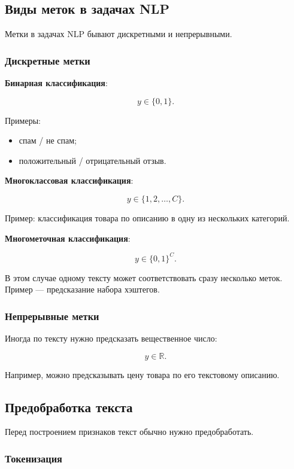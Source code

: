 \documentclass[a4paper,12pt]{article}
\begin{document}
\subsection{Виды меток в задачах NLP}

Метки в задачах NLP бывают дискретными и непрерывными.

\subsubsection{Дискретные метки}

\textbf{Бинарная классификация}:

\[
y \in \{0, 1\}.
\]

Примеры:

\begin{itemize}
    \item спам / не спам;
    \item положительный / отрицательный отзыв.
\end{itemize}

\textbf{Многоклассовая классификация}:

\[
y \in \{1, 2, \dots, C\}.
\]

Пример: классификация товара по описанию в одну из нескольких категорий.

\textbf{Многометочная классификация}:

\[
y \in \{0,1\}^C.
\]

В этом случае одному тексту может соответствовать сразу несколько меток. Пример --- предсказание набора хэштегов.

\subsubsection{Непрерывные метки}

Иногда по тексту нужно предсказать вещественное число:

\[
y \in \mathbb{R}.
\]

Например, можно предсказывать цену товара по его текстовому описанию.

\subsection{Предобработка текста}

Перед построением признаков текст обычно нужно предобработать.

\subsubsection{Токенизация}
\end{document}

